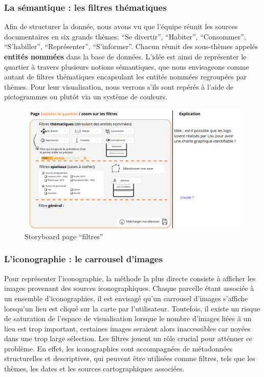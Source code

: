 \subsubsection{La sémantique : les filtres thématiques}

Afin de structurer la donnée, nous avons vu que l'équipe réunit les sources documentaires en six grands thèmes: \enquote{Se divertir}, \enquote{Habiter}, \enquote{Consommer}, \enquote{S'habiller}, \enquote{Représenter}, \enquote{S'informer}. Chacun réunit des sous-thèmes appelés \textbf{entités nommées} dans la base de données. L'idée est ainsi de représenter le quartier à travers plusieurs notions sémantiques, que nous envisageons comme autant de filtres thématiques encapsulant les entités nommées regroupées par thèmes. Pour leur visualisation, nous verrons s'ils sont repérés à l'aide de pictogrammes ou plutôt via un système de couleurs.

\begin{figure}[h!]
    \centering
    \includegraphics[width=1\linewidth]{images/storyboard-filtres.png}
    \caption{Storyboard page \enquote{filtres}}
    \label{fig:story-filtres}
\end{figure}

\subsubsection{L’iconographie : le carrousel d’images}

Pour représenter l'iconographie, la méthode la plus directe consiste à afficher les images provenant des sources iconographiques. Chaque parcelle étant associée à un ensemble d'iconographies, il est envisagé qu'un carrousel d'images s'affiche lorsqu'un lieu est cliqué sur la carte par l'utilisateur. Toutefois, il existe un risque de saturation de l'espace de visualisation lorsque le nombre d'images liées à un lieu est trop important, certaines images seraient alors inaccessibles car noyées dans une trop large sélection. Les filtres jouent un rôle crucial pour atténuer ce problème. En effet, les iconographies sont accompagnées de métadonnées structurelles et descriptives, qui peuvent être utilisées comme filtres, tels que les thèmes, les dates et les sources cartographiques associées.

